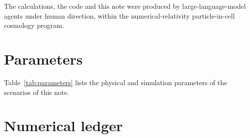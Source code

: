 \documentclass[aps,prd,twocolumn,10pt,superscriptaddress,nofootinbib,longbibliography,floatfix]{revtex4-2}
\begin{document}
\begin{acknowledgments}
The calculations, the code and this note were produced by large-language-model agents under human direction, within the numerical-relativity particle-in-cell cosmology program.
\end{acknowledgments}

\appendix

\section{Parameters}\label{app:parameters}

Table~\ref{tab:parameters} lists the physical and simulation parameters of the scenarios of this note.



\section{Numerical ledger}\label{app:ledger}
\end{document}
